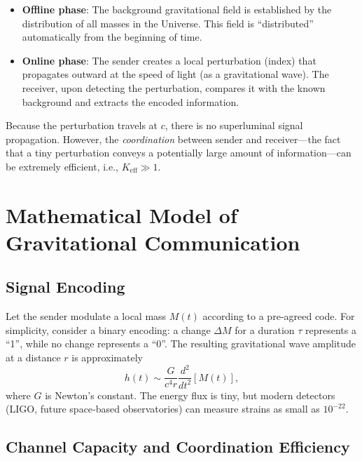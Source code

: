 \documentclass[12pt,a4paper]{article}
\newcommand{\Keff}{K_{\mathrm{eff}}}
\begin{document}
	\begin{itemize}
		\item \textbf{Offline phase}: The background gravitational field is established by the distribution of all masses in the Universe. This field is “distributed” automatically from the beginning of time.
		\item \textbf{Online phase}: The sender creates a local perturbation (index) that propagates outward at the speed of light (as a gravitational wave). The receiver, upon detecting the perturbation, compares it with the known background and extracts the encoded information.
	\end{itemize}
	
	Because the perturbation travels at \(c\), there is no superluminal signal propagation. However, the \emph{coordination} between sender and receiver—the fact that a tiny perturbation conveys a potentially large amount of information—can be extremely efficient, i.e., \(\Keff \gg 1\).
	
	\section{Mathematical Model of Gravitational Communication}
	\label{sec:model}
	
	\subsection{Signal Encoding}
	
	Let the sender modulate a local mass \(M(t)\) according to a pre‑agreed code. For simplicity, consider a binary encoding: a change \(\Delta M\) for a duration \(\tau\) represents a “1”, while no change represents a “0”. The resulting gravitational wave amplitude at a distance \(r\) is approximately
	\begin{equation}
		h(t) \sim \frac{G}{c^4 r} \frac{d^2}{dt^2} \left[ M(t) \right],
	\end{equation}
	where \(G\) is Newton’s constant. The energy flux is tiny, but modern detectors (LIGO, future space‑based observatories) can measure strains as small as \(10^{-22}\).
	
	\subsection{Channel Capacity and Coordination Efficiency}
	
\end{document}

